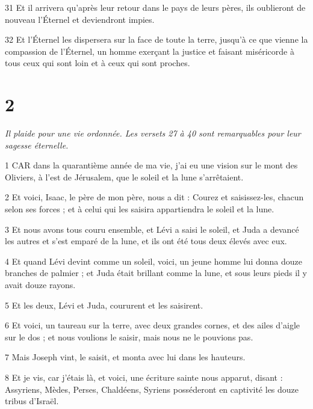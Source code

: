 \par 31 Et il arrivera qu'après leur retour dans le pays de leurs pères, ils oublieront de nouveau l'Éternel et deviendront impies.

\par 32 Et l'Éternel les dispersera sur la face de toute la terre, jusqu'à ce que vienne la compassion de l'Éternel, un homme exerçant la justice et faisant miséricorde à tous ceux qui sont loin et à ceux qui sont proches.



\chapter{2}

\par \textit{Il plaide pour une vie ordonnée. Les versets 27 à 40 sont remarquables pour leur sagesse éternelle.}

\par 1 CAR dans la quarantième année de ma vie, j'ai eu une vision sur le mont des Oliviers, à l'est de Jérusalem, que le soleil et la lune s'arrêtaient.

\par 2 Et voici, Isaac, le père de mon père, nous a dit : Courez et saisissez-les, chacun selon ses forces ; et à celui qui les saisira appartiendra le soleil et la lune.

\par 3 Et nous avons tous couru ensemble, et Lévi a saisi le soleil, et Juda a devancé les autres et s'est emparé de la lune, et ils ont été tous deux élevés avec eux.

\par 4 Et quand Lévi devint comme un soleil, voici, un jeune homme lui donna douze branches de palmier ; et Juda était brillant comme la lune, et sous leurs pieds il y avait douze rayons.

\par 5 Et les deux, Lévi et Juda, coururent et les saisirent.

\par 6 Et voici, un taureau sur la terre, avec deux grandes cornes, et des ailes d'aigle sur le dos ; et nous voulions le saisir, mais nous ne le pouvions pas.

\par 7 Mais Joseph vint, le saisit, et monta avec lui dans les hauteurs.

\par 8 Et je vis, car j'étais là, et voici, une écriture sainte nous apparut, disant : Assyriens, Mèdes, Perses, Chaldéens, Syriens posséderont en captivité les douze tribus d'Israël.

